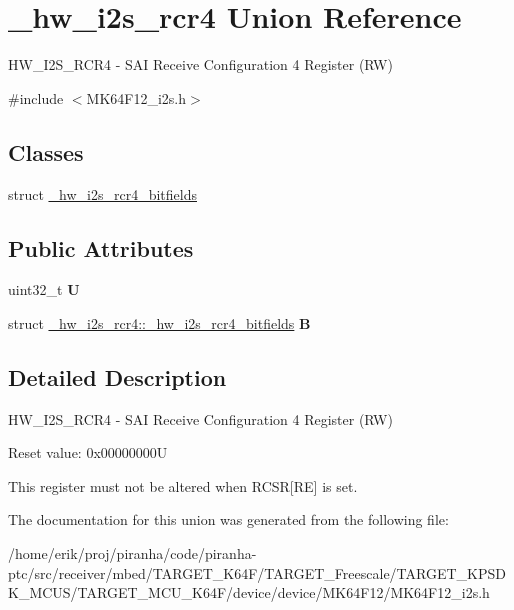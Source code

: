 \hypertarget{union__hw__i2s__rcr4}{}\section{\+\_\+hw\+\_\+i2s\+\_\+rcr4 Union Reference}
\label{union__hw__i2s__rcr4}


H\+W\+\_\+\+I2\+S\+\_\+\+R\+C\+R4 -\/ S\+AI Receive Configuration 4 Register (RW)  




{\ttfamily \#include $<$M\+K64\+F12\+\_\+i2s.\+h$>$}

\subsection*{Classes}
\begin{DoxyCompactItemize}
\item 
struct \hyperlink{struct__hw__i2s__rcr4_1_1__hw__i2s__rcr4__bitfields}{\+\_\+hw\+\_\+i2s\+\_\+rcr4\+\_\+bitfields}
\end{DoxyCompactItemize}
\subsection*{Public Attributes}
\begin{DoxyCompactItemize}
\item 
uint32\+\_\+t {\bfseries U}\hypertarget{union__hw__i2s__rcr4_a7143d92d7317dd4c7e1458ad493671e2}{}\label{union__hw__i2s__rcr4_a7143d92d7317dd4c7e1458ad493671e2}

\item 
struct \hyperlink{struct__hw__i2s__rcr4_1_1__hw__i2s__rcr4__bitfields}{\+\_\+hw\+\_\+i2s\+\_\+rcr4\+::\+\_\+hw\+\_\+i2s\+\_\+rcr4\+\_\+bitfields} {\bfseries B}\hypertarget{union__hw__i2s__rcr4_a890db8f081ab79d50d42d38e1152154b}{}\label{union__hw__i2s__rcr4_a890db8f081ab79d50d42d38e1152154b}

\end{DoxyCompactItemize}


\subsection{Detailed Description}
H\+W\+\_\+\+I2\+S\+\_\+\+R\+C\+R4 -\/ S\+AI Receive Configuration 4 Register (RW) 

Reset value\+: 0x00000000U

This register must not be altered when R\+C\+SR\mbox{[}RE\mbox{]} is set. 

The documentation for this union was generated from the following file\+:\begin{DoxyCompactItemize}
\item 
/home/erik/proj/piranha/code/piranha-\/ptc/src/receiver/mbed/\+T\+A\+R\+G\+E\+T\+\_\+\+K64\+F/\+T\+A\+R\+G\+E\+T\+\_\+\+Freescale/\+T\+A\+R\+G\+E\+T\+\_\+\+K\+P\+S\+D\+K\+\_\+\+M\+C\+U\+S/\+T\+A\+R\+G\+E\+T\+\_\+\+M\+C\+U\+\_\+\+K64\+F/device/device/\+M\+K64\+F12/M\+K64\+F12\+\_\+i2s.\+h\end{DoxyCompactItemize}
